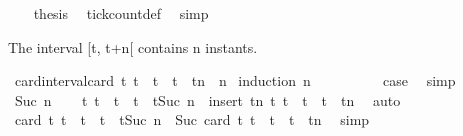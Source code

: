 \begin{isabellebody}
\isanewline
\ \ \isamarkupfalse%
\ {\isacharquery}thesis\ \isamarkupfalse%
\ tick{\isacharunderscore}count{\isacharunderscore}def\ \isamarkupfalse%
\ simp\isanewline
{}\isamarkupfalse%
%
\endisatagproof
{\isafoldproof}%
%
\isadelimproof
%
\endisadelimproof
%
\begin{isamarkuptext}%
The interval [t, t+n[ contains n instants.%
\end{isamarkuptext}\isamarkuptrue%
\isamarkupfalse%
\ card{\isacharunderscore}interval{\isacharcolon}{\isacartoucheopen}card\ {\isacharbraceleft}t{\isachardot}\ t\ {\isasymle}\ t\ {\isasymand}\ t\ {\isacharless}\ tn{\isacharbraceright}\ {\isacharequal}\ n{\isacartoucheclose}\isanewline
%
\isadelimproof
%
\endisadelimproof
%
\isatagproof
{}\isamarkupfalse%
\ {\isacharparenleft}induction\ n{\isacharparenright}\isanewline
\ \ \isamarkupfalse%
\ {}\isanewline
\ \ \isamarkupfalse%
\ \isamarkupfalse%
\ {\isacharquery}case\ \isamarkupfalse%
\ simp\isanewline
{}\isamarkupfalse%
\isanewline
\ \ \isamarkupfalse%
\ {\isacharparenleft}Suc\ n{\isacharparenright}\isanewline
\ \ \isamarkupfalse%
\ {\isacartoucheopen}{\isacharbraceleft}t{\isachardot}\ t\ {\isasymle}\ t\ {\isasymand}\ t\ {\isacharless}\ tSuc\ n{\isacharparenright}{\isacharbraceright}\ {\isacharequal}\ insert\ {\isacharparenleft}tn{\isacharparenright}\ {\isacharbraceleft}t{\isachardot}\ t\ {\isasymle}\ t\ {\isasymand}\ t\ {\isacharless}\ tn{\isacharbraceright}{\isacartoucheclose}\ \isamarkupfalse%
\ auto\isanewline
\ \ \isamarkupfalse%
\ {\isacartoucheopen}card\ {\isacharbraceleft}t{\isachardot}\ t\ {\isasymle}\ t\ {\isasymand}\ t\ {\isacharless}\ tSuc\ n{\isacharparenright}{\isacharbraceright}\ {\isacharequal}\ Suc\ {\isacharparenleft}card\ {\isacharbraceleft}t{\isachardot}\ t\ {\isasymle}\ t\ {\isasymand}\ t\ {\isacharless}\ tn{\isacharbraceright}{\isacharparenright}{\isacartoucheclose}\ \isamarkupfalse%
\ simp\isanewline
\ \ \isamarkupfalse%

\end{isabellebody}
